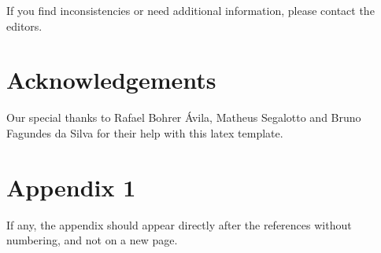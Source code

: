 \documentclass[english, spanish, brazilian]{RBIEarticle} %
\begin{document}
If you find inconsistencies or need additional information, please contact the editors.


\section*{Acknowledgements}
Our special thanks to Rafael Bohrer Ávila, Matheus Segalotto and Bruno Fagundes da Silva for their help with this latex template. 



\printbibliography


 \section*{Appendix 1}
\label{apendice1}

If any, the appendix should appear directly after the references without numbering, and not on a new page.
\end{document}
